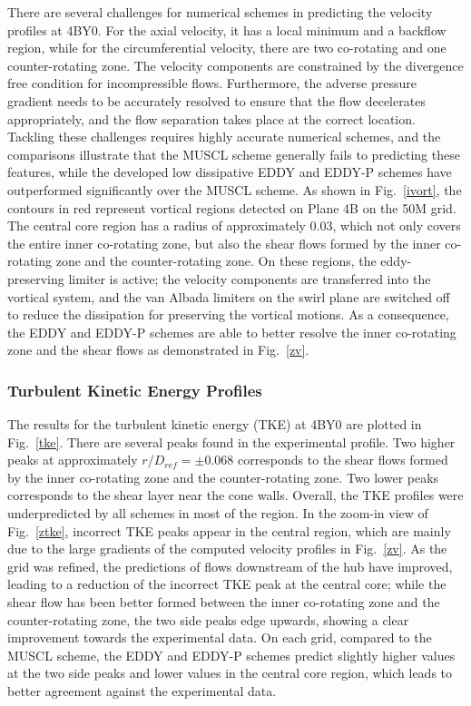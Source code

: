 There are several challenges for numerical schemes in predicting the velocity profiles at 4BY0. For the axial velocity, it has a local minimum and a backflow region, while for the circumferential velocity, there are two co-rotating and one counter-rotating zone. The velocity components are constrained by the divergence free condition for incompressible flows. Furthermore, the adverse pressure gradient needs to be accurately resolved to ensure that the flow decelerates appropriately, and the flow separation takes place at the correct location. Tackling these challenges requires highly accurate numerical schemes, and the comparisons illustrate that the MUSCL scheme generally fails to predicting these features, while the developed low dissipative EDDY and EDDY-P schemes have outperformed significantly over the MUSCL scheme. As shown in Fig.~\ref{ivort}, the contours in red represent vortical regions detected on Plane 4B on the 50M grid. The central core region has a radius of approximately 0.03, which not only covers the entire inner co-rotating zone, but also the shear flows formed by the inner co-rotating zone and the counter-rotating zone. On these regions, the eddy-preserving limiter is active; the velocity components are transferred into the vortical system, and the van Albada limiters on the swirl plane are switched off to reduce the dissipation for preserving the vortical motions. As a consequence, the EDDY and EDDY-P schemes are able to better resolve the inner co-rotating zone and the shear flows as demonstrated in Fig.~\ref{zv}.
\subsubsection{Turbulent Kinetic Energy Profiles}
The results for the turbulent kinetic energy (TKE)  at 4BY0 are plotted in Fig.~\ref{tke}. There are several peaks found in the experimental profile. Two higher peaks at approximately $r/D_{ref}=\pm 0.068$ corresponds to the shear flows formed by the inner co-rotating zone and the counter-rotating zone. Two lower peaks corresponds to the shear layer near the cone walls. Overall, the TKE profiles were underpredicted by all schemes in most of the region. In the zoom-in view of Fig.~\ref{ztke}, incorrect TKE peaks appear in the central region, which are mainly due to the large gradients of the computed velocity profiles in Fig.~\ref{zv}. As the grid was refined, the predictions of flows downstream of the hub have improved, leading to a reduction of the incorrect TKE peak at the central core; while the shear flow has been better formed between the inner co-rotating zone and the counter-rotating zone, the two side peaks edge upwards, showing a clear improvement towards the experimental data. On each grid, compared to the MUSCL scheme, the EDDY and EDDY-P schemes predict slightly higher values at the two side peaks and lower values in the central core region, which leads to better agreement against the experimental data. 
